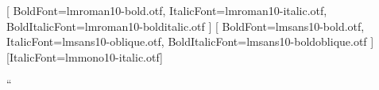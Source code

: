 
\usepackage{eurosym}
\usepackage{iftex}
\ifpdftex
  \usepackage[T1]{fontenc}
  \usepackage[utf8]{inputenc}
  \usepackage{lmodern}
\else
  \usepackage{fontspec}
  \setmainfont{lmroman10-regular.otf}[
    BoldFont=lmroman10-bold.otf,
    ItalicFont=lmroman10-italic.otf,
    BoldItalicFont=lmroman10-bolditalic.otf
  ]
  \setsansfont{lmsans10-regular.otf}[
    BoldFont=lmsans10-bold.otf,
    ItalicFont=lmsans10-oblique.otf,
    BoldItalicFont=lmsans10-boldoblique.otf
  ]
  \setmonofont{lmmono10-regular.otf}[ItalicFont=lmmono10-italic.otf]
\fi
\ifpdftex
  \usepackage{microtype}
\fi
\usepackage[catalan, provide=*]{babel}
\usepackage[autostyle=true,babel=true]{csquotes}
  {\guillemotleft}{\guillemotright}
  {\quotedblbase}{\textquotedblleft}
\usepackage{amsmath,mathtools}%
\usepackage{geometry}
\usepackage{import}
\usepackage{graphicx}
\usepackage{tabularx}
\usepackage{xltabular}%
\usepackage{tikz}
\usetikzlibrary{positioning,arrows.meta,matrix}
\usepackage[all]{xy}%
\usepackage{float}
\usepackage[section]{placeins}%
\usepackage{pgfplots}
\pgfplotsset{compat=1.18}
\usepackage{imakeidx}
\usepackage{booktabs}


